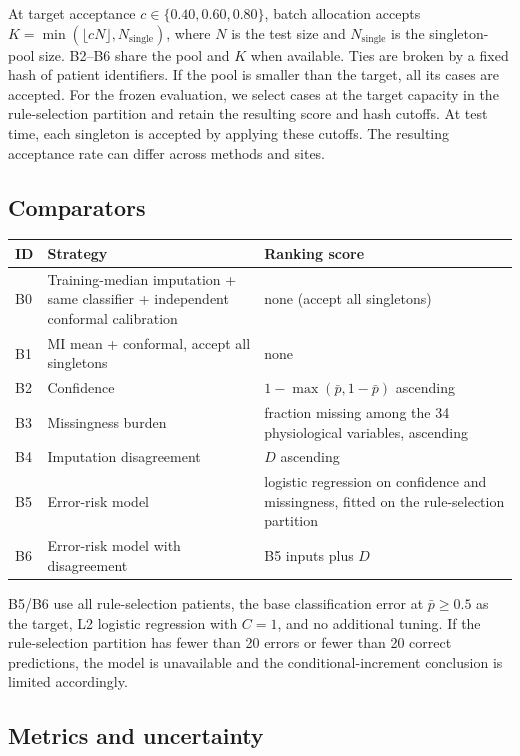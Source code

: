 At target acceptance $c\in\{0.40,0.60,0.80\}$, batch allocation accepts $K=\min(\lfloor cN\rfloor,N_{\mathrm{single}})$, where $N$ is the test size and $N_{\mathrm{single}}$ is the singleton-pool size. B2--B6 share the pool and $K$ when available. Ties are broken by a fixed hash of patient identifiers. If the pool is smaller than the target, all its cases are accepted. For the frozen evaluation, we select cases at the target capacity in the rule-selection partition and retain the resulting score and hash cutoffs. At test time, each singleton is accepted by applying these cutoffs. The resulting acceptance rate can differ across methods and sites.

\subsection{Comparators}

\begin{table}[t]
\centering
\small
\begin{tabular}{@{}p{}p{}p{}@{}}
\toprule
ID & Strategy & Ranking score \\
\midrule
B0 & Training-median imputation + same classifier + independent conformal calibration & none (accept all singletons) \\
B1 & MI mean + conformal, accept all singletons & none \\
B2 & Confidence & $1-\max(\bar p,1-\bar p)$ ascending \\
B3 & Missingness burden & fraction missing among the 34 physiological variables, ascending \\
B4 & Imputation disagreement & $D$ ascending \\
B5 & Error-risk model & logistic regression on confidence and missingness, fitted on the rule-selection partition \\
B6 & Error-risk model with disagreement & B5 inputs plus $D$ \\
\bottomrule
\end{tabular}
\end{table}

B5/B6 use all rule-selection patients, the base classification error at $\bar p\ge0.5$ as the target, L2 logistic regression with $C=1$, and no additional tuning. If the rule-selection partition has fewer than 20 errors or fewer than 20 correct predictions, the model is unavailable and the conditional-increment conclusion is limited accordingly.

\subsection{Metrics and uncertainty}


